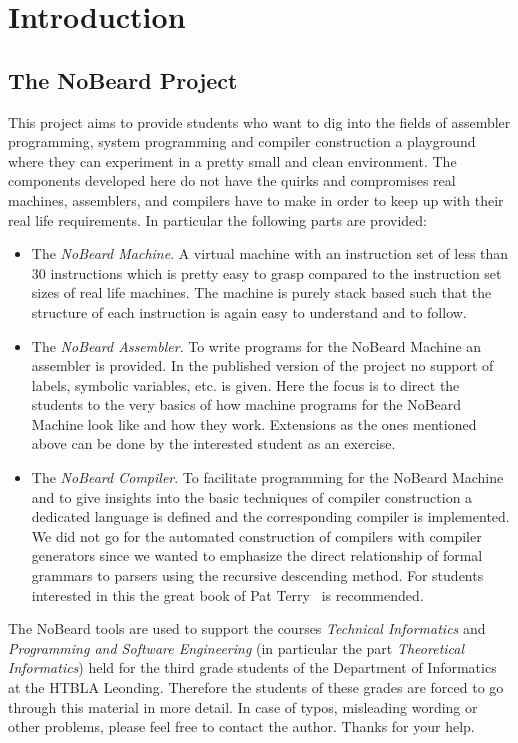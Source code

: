 \documentclass[11pt]{report}
\newcommand{\leongage}{NoBeard}
\begin{document}
\pagebreak

\tableofcontents
\chapter{Introduction}
\section{The \leongage{} Project}
This project aims to provide students who want to dig into the fields of assembler programming, system programming and compiler construction a playground where they can experiment in a pretty small and clean environment. The components developed here do not have the quirks and compromises real machines, assemblers, and compilers have to make in order to keep up with their real life requirements. In particular the following parts are provided:

\begin{itemize}
	\item The {\em \leongage{} Machine}. A virtual machine with an instruction set of less than 30 instructions which is pretty easy to grasp compared to the instruction set sizes of real life machines. The machine is purely stack based such that the structure of each instruction is again easy to understand and to follow.
	\item The {\em \leongage{} Assembler}. To write programs for the \leongage{} Machine an assembler is provided. In the published version of the project no support of labels, symbolic variables, etc. is given. Here the focus is to direct the students to the very basics of how machine programs for the \leongage{} Machine look like and how they work. Extensions as the ones mentioned above can be done by the interested student as an exercise.
	\item The {\em \leongage{} Compiler}. To facilitate programming for the \leongage{} Machine and to give insights into the basic techniques of compiler construction a dedicated language is defined and the corresponding compiler is implemented. We did not go for the automated construction of compilers with compiler generators since we wanted to emphasize the direct relationship of formal grammars to parsers using the recursive descending method. For students interested in this the great book of Pat Terry~\cite{terry_compiling_2004} is recommended.
\end{itemize}

The \leongage{} tools are used to support the courses {\em Technical Informatics} and {\em Programming and Software Engineering} (in particular the part {\em Theoretical Informatics}) held for the third grade students of the Department of Informatics at the HTBLA Leonding. Therefore the students of these grades are forced to go through this material in more detail. In case of typos, misleading wording or other problems, please feel free to contact the author. Thanks for your help.
\end{document}
